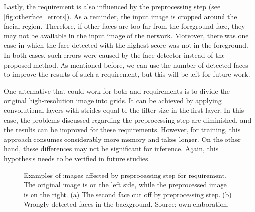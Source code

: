 Lastly, the \otherfacesortoys requirement is also influenced by the preprocessing step (see \autoref{fig:otherface_errors}). As a reminder, the input image is cropped around the facial region. Therefore, if other faces are too far from the foreground face, they may not be available in the input image of the network. Moreover, there was one case in which the face detected with the highest score was not in the foreground. In both cases, such errors were caused by the face detector instead of the proposed method. As mentioned before, we can use the number of detected faces to improve the results of such a requirement, but this will be left for future work.
 
 
One alternative that could work for both \pixelation and \otherfacesortoys requirements is to divide the original high-resolution image into grids. It can be achieved by applying convolutional layers with strides equal to the filter size in the first layer. In this case, the problems discussed regarding the preprocessing step are diminished, and the results can be improved for these requirements. However, for training, this approach consumes considerably more memory and takes longer. On the other hand, these differences may not be significant for inference. Again, this hypothesis needs to be verified in future studies.
 
\begin{figure}[htb]
\centering
{}
\hfill
{} 
\caption{Examples of images affected by preprocessing step for \otherfacesortoys requirement. The original image is on the left side, while the preprocessed image is on the right. (a) The second face cut off by preprocessing step. (b) Wrongly detected faces in the background. Source: own elaboration.}
\label{fig:otherface_errors}
\end{figure}
 
